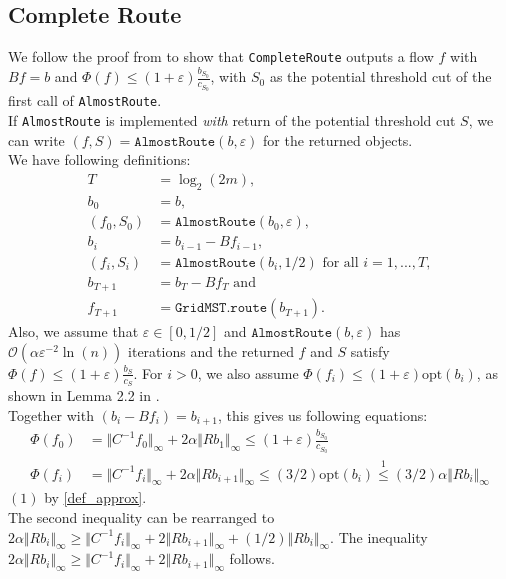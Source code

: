 \subsection{Complete Route}
\label{sec_math_cr}
We follow the proof from \cite{nmfnlt} to show that \texttt{CompleteRoute} outputs a flow $f$ with $Bf=b$ and $\Phi(f)\leq (1+\varepsilon)\frac{b_{S_0}}{c_{S_0}}$, with $S_0$ as the potential threshold cut of the first call of \texttt{AlmostRoute}.\\
If \texttt{AlmostRoute} is implemented \emph{with} return of the potential threshold cut $S$, we can write $(f,S)=\texttt{AlmostRoute}(b,\varepsilon)$ for the returned objects.\\
We have following definitions:
\begin{align*}
T&=\log_2(2m),\\
b_0&=b,\\
(f_0,S_0)&=\texttt{AlmostRoute}(b_0,\varepsilon),\\
b_i&=b_{i-1}-Bf_{i-1},\\
(f_i,S_i)&=\texttt{AlmostRoute}(b_i,1/2) \text{ for all } i=1,...,T,\\
b_{T+1}&=b_T-Bf_T \text{ and}\\
f_{T+1}&=\texttt{GridMST.route}(b_{T+1}).
\end{align*}
Also, we assume that $\varepsilon\in [0,1/2]$ and $\texttt{AlmostRoute}(b,\varepsilon)$ has $\mathcal{O}(\alpha\varepsilon^{-2}\ln(n))$ iterations and the returned $f$ and $S$ satisfy $\Phi(f)\leq (1+\varepsilon)\frac{b_S}{c_S}$. For $i>0$, we also assume $\Phi(f_i)\leq (1+\varepsilon)\text{opt}(b_i)$, as shown in Lemma 2.2 in \cite{nmfnlt}.\\
Together with $(b_i-Bf_i)=b_{i+1}$, this gives us following equations:
\begin{align*}
\Phi(f_0)&=\Vert C^{-1}f_0\Vert_\infty+2\alpha\Vert Rb_1\Vert_\infty \leq (1+\varepsilon) \frac{b_{S_0}}{c_{S_0}}\\
\Phi(f_i)&=\Vert C^{-1}f_i\Vert_\infty+2\alpha\Vert Rb_{i+1}\Vert_\infty \leq (3/2) \text{opt}(b_i) \stackrel{1}{\leq} (3/2)\alpha\Vert Rb_i\Vert_\infty
\end{align*}
$(1)$ by \ref{def_approx}.\\
The second inequality can be rearranged to $2\alpha\Vert Rb_i\Vert_\infty \geq \Vert C^{-1}f_i\Vert_\infty+2\Vert Rb_{i+1}\Vert_\infty+(1/2)\Vert Rb_{i}\Vert_\infty$. The inequality $2\alpha\Vert Rb_i\Vert_\infty\geq \Vert C^{-1}f_i\Vert_\infty+2\Vert Rb_{i+1}\Vert_\infty$ follows.\\
